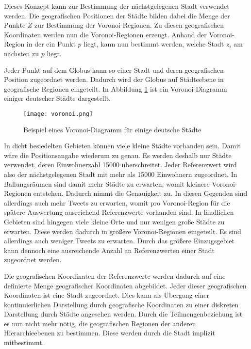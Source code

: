 			Dieses Konzept kann zur Bestimmung der nächstgelegenen Stadt verwendet werden. 
			Die geografischen Positionen der Städte bilden dabei die Menge der Punkte $Z$ zur Bestimmung der Voronoi-Regionen.
			Zu diesen geografischen Koordinaten werden nun die Voronoi-Regionen erzeugt. 
			Anhand der Voronoi-Region in der ein Punkt $p$ liegt, kann nun bestimmt werden, welche Stadt $z_i$ am nächsten zu $p$ liegt.

			Jeder Punkt auf dem Globus kann so einer Stadt und deren geografischen Position zugeordnet werden.
			Dadurch wird der Globus auf Städteebene in geografische Regionen eingeteilt.
			In Abbildung \ref{img:voronoi} ist ein Voronoi-Diagramm einiger deutscher Städte dargestellt.

			\begin{figure}[h!]
				\begin{center}
				\texttt{[image: voronoi.png]}
				\caption{Beispiel eines Voronoi-Diagramm für einige deutsche Städte}
				\label{img:voronoi}
				\end{center}
			\end{figure}	


			In dicht besiedelten Gebieten können viele kleine Städte vorhanden sein. 
			Damit wäre die Positionsangabe wiederum zu genau.
			Es werden deshalb nur Städte verwendet, deren Einwohnerzahl 15000 überschreitet.
			Jeder Referenzwert wird also der nächstgelegenen Stadt mit mehr als 15000 Einwohnern zugeordnet.
			In Ballungsräumen sind damit mehr Städte zu erwarten, womit kleinere Voronoi-Regionen entstehen.
			Dadurch nimmt die Genauigkeit zu.
			In diesen Gegenden sind allerdings auch mehr Tweets zu erwarten, womit pro Voronoi-Region für die spätere Auswertung ausreichend Referenzwerte vorhanden sind. 
			In ländlichen Gebieten sind hingegen viele kleine Orte und nur wenigen große Städte zu erwarten. 
			Diese werden dadurch in größere Voronoi-Regionen eingeteilt.
			Es sind allerdings auch weniger Tweets zu erwarten. 
			Durch das größere Einzugsgebiet kann dennoch eine ausreichende Anzahl an Referenzwerten einer Stadt zugeordnet werden. 

			Die geografischen Koordinaten der Referenzwerte werden dadurch auf eine definierte Menge geografischer Koordinaten abgebildet. 
			Jeder dieser geografischen Koordinaten ist eine Stadt zugeordnet.
			Dies kann als Übergang einer kontinuierlichen Darstellung durch geografische Koordinaten zu einer diskreten Darstellung durch Städte angesehen werden. 
			Durch die Teilmengenbeziehung ist es nun nicht mehr nötig, die geografischen Regionen der anderen Hierarchieebenen zu bestimmen. 
			Diese werden durch die Stadt implizit mitbestimmt.
			
